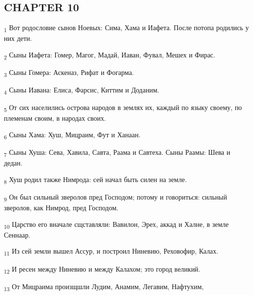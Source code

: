 \subsection{CHAPTER 10}
\begin{tcolorbox}
\textsubscript{1} Вот родословие сынов Ноевых: Сима, Хама и Иафета. После потопа родились у них дети.
\end{tcolorbox}
\begin{tcolorbox}
\textsubscript{2} Сыны Иафета: Гомер, Магог, Мадай, Иаван, Фувал, Мешех и Фирас.
\end{tcolorbox}
\begin{tcolorbox}
\textsubscript{3} Сыны Гомера: Аскеназ, Рифат и Фогарма.
\end{tcolorbox}
\begin{tcolorbox}
\textsubscript{4} Сыны Иавана: Елиса, Фарсис, Киттим и Доданим.
\end{tcolorbox}
\begin{tcolorbox}
\textsubscript{5} От сих населились острова народов в землях их, каждый по языку своему, по племенам своим, в народах своих.
\end{tcolorbox}
\begin{tcolorbox}
\textsubscript{6} Сыны Хама: Хуш, Мицраим, Фут и Ханаан.
\end{tcolorbox}
\begin{tcolorbox}
\textsubscript{7} Сыны Хуша: Сева, Хавила, Савта, Раама и Савтеха. Сыны Раамы: Шева и дедан.
\end{tcolorbox}
\begin{tcolorbox}
\textsubscript{8} Хуш родил также Нимрода: сей начал быть силен на земле.
\end{tcolorbox}
\begin{tcolorbox}
\textsubscript{9} Он был сильный зверолов пред Господом; потому и говориться: сильный зверолов, как Нимрод, пред Господом.
\end{tcolorbox}
\begin{tcolorbox}
\textsubscript{10} Царство его вначале сщставляли: Вавилон, Эрех, аккад и Халне, в земле Сеннаар.
\end{tcolorbox}
\begin{tcolorbox}
\textsubscript{11} Из сей земли вышел Ассур, и построил Ниневию, Реховофир, Калах.
\end{tcolorbox}
\begin{tcolorbox}
\textsubscript{12} И ресен между Ниневию и между Калахом; это город великий.
\end{tcolorbox}
\begin{tcolorbox}
\textsubscript{13} От Мицраима произщшли Лудим, Анамим, Легавим, Нафтухим,
\end{tcolorbox}
